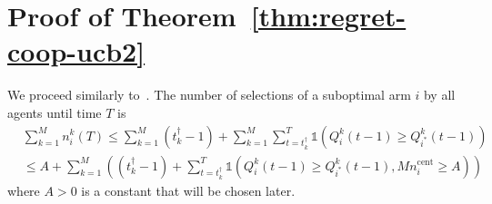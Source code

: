 \documentclass[final,5p,times,twocolumn]{elsarticle}
\theoremstyle{definition}
\begin{document}


	
\section{Proof of Theorem~\ref{thm:regret-coop-ucb2}}\label{app:proof-thm2}
We proceed similarly to~\cite{PA-NCB-PF:02}.  The number of selections of a suboptimal arm $i$ by all agents until time $T$ is 
\begin{align}
& \sum_{k=1}^M  n_i^k(T) 
\leq \sum_{k=1}^M (t_k^\dag-1) + \sum_{k=1}^M \sum_{t= t_k^\dag}^T  \mathds{1}(Q_i^k(t-1) \geq Q_{i^*}^k(t-1))\nonumber \\
& \leq  A + \! \sum_{k=1}^M \left( (t_k^\dag-1) %
\!+\! \sum_{t=t_k^\dag}^T \mathds{1}(Q_i^k(t-1) \geq Q_{i^*}^k(t-1), M {n}^{\text{cent}}_i \geq A)\right)  \label{suboptimal-samples}
\end{align}
where $A >0$ is a constant that will be chosen later.  
\end{document}
